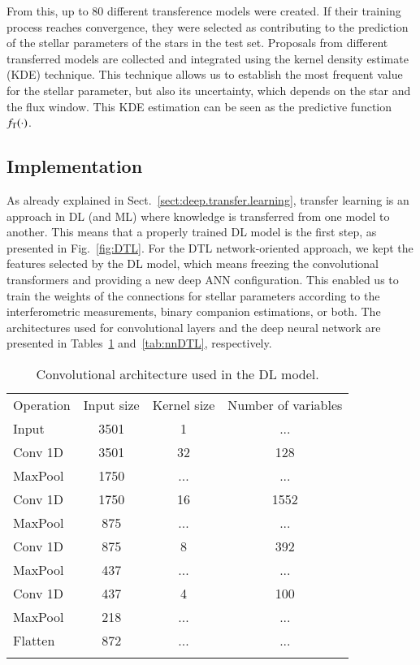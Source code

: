 \documentclass{aa}
\begin{document}
From this, up to 80 different transference models were created. If their training process reaches convergence, they were selected as contributing to the prediction of the stellar parameters of the stars in the test set. Proposals from different transferred models are collected and integrated using the kernel density estimate (KDE) technique. This technique allows us to establish the most frequent value for the stellar parameter, but also its uncertainty, which {depends} on the star and the flux window. This KDE estimation can be seen as the predictive function $f_{\rm T}(\cdot)$.



\subsection{Implementation}

As already explained in Sect.~\ref{sect:deep.transfer.learning}, transfer learning is an approach in DL (and ML) where knowledge is transferred from one model to another. 
This means that a properly trained DL model is the first step, as presented in Fig.~\ref{fig:DTL}.
For the DTL network-oriented approach, we kept the features selected by the DL model, which means freezing the convolutional transformers and providing a new deep ANN configuration. This enabled us to train the weights of the connections for stellar parameters according to the interferometric measurements, binary companion estimations, or both. 
The architectures used for convolutional layers and the deep neural network are presented in Tables~\ref{tab:convDL} and~\ref{tab:nnDTL}, respectively.

\begin{table}[]
\caption{Convolutional architecture used in the DL model.}
\label{tab:convDL}
\centering %
\begin{tabular}{lccc}
   \hline
    \hline
    \noalign{\smallskip}
Operation & Input size & Kernel size & Number of variables \\
    \noalign{\smallskip}
\hline
    \noalign{\smallskip}
Input              & 3501         & 1          &   ...    \\
Conv 1D            & 3501         & 32         & 128   \\
MaxPool            & 1750         &    ...        &   ...    \\
Conv 1D            & 1750         & 16         & 1552  \\
MaxPool            & 875          &   ...         &    ...   \\
Conv 1D            & 875          & 8          & 392   \\
MaxPool            & 437          &   ...         &    ...   \\
Conv 1D            & 437          & 4          & 100   \\
MaxPool            & 218          &   ...         & ...      \\
Flatten            & 872          &   ...         &    ...   \\
    \noalign{\smallskip}
\hline
\end{tabular}
\end{table}
\end{document}
